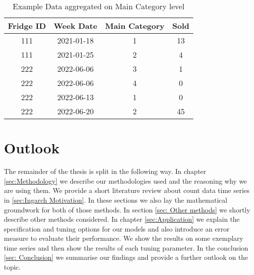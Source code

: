 \begin{table}[h!]
\centering
\begin{tabular}{cccc}
\hline
\rowcolor[HTML]{FFFFFF} 
\textbf{Fridge ID} & \textbf{Week Date} & \textbf{Main Category} & \textbf{Sold} \\ \hline
111                & 2021-01-18         & 1                      & 13             \\
111                & 2021-01-25         & 2                      & 4             \\
222                & 2022-06-06         & 3                      & 1             \\
222                & 2022-06-06         & 4                      & 0             \\
222                & 2022-06-13         & 1                      & 0             \\
222                & 2022-06-20         & 2                      & 45            \\ \hline
\end{tabular}
\caption{Example Data aggregated on Main Category level}
\label{tab:ExampleData aggregated}
\end{table}

\section{Outlook}
\label{sec: Outlook}

The remainder of the thesis is split in the following way. In chapter \ref{sec:Methodology} we describe our methodologies used and the reasoning why we are using them. We provide a short literature review about count data time series in \ref{sec:Ingarch Motivation}. In these sections we also lay the mathematical groundwork for both of those methods. In section \ref{sec: Other methods} we shortly describe other methods considered. In chapter \ref{sec:Application} we explain the specification and tuning options for our models and also introduce an error measure to evaluate their performance. We show the results on some exemplary time series and then show the results of each tuning parameter. In the conclusion \ref{sec: Conclusion} we summarise our findings and provide a further outlook on the topic. 